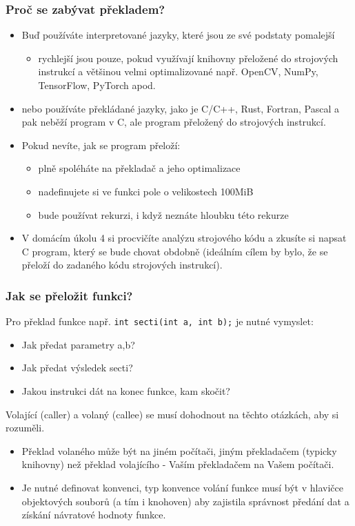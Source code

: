 \documentclass{beamer}
\begin{document}
\begin{frame}
\frametitle{Proč se zabývat překladem?}

\begin{itemize}
 \item Buď používáte interpretované jazyky, které jsou ze své podstaty pomalejší 
 \begin{itemize}
 \item rychlejší jsou pouze, pokud využívají knihovny přeložené do strojových instrukcí a většinou velmi optimalizované např. OpenCV, NumPy, TensorFlow,  PyTorch apod.
 \end{itemize}
 \item nebo používáte překládané jazyky, jako je C/C++, Rust, Fortran, Pascal a pak neběží program v C, ale program přeložený do strojových instrukcí. 
 \item Pokud nevíte, jak se program přeloží:
\begin{itemize}
 \item plně spoléháte na překladač a jeho optimalizace
 \item nadefinujete si ve funkci pole o velikostech 100MiB
 \item bude používat rekurzi, i když neznáte hloubku této rekurze
\end{itemize}
\item V domácím úkolu 4 si procvičíte analýzu strojového kódu a zkusíte si napsat C program, který se bude chovat obdobně (ideálním cílem by bylo, že se přeloží do zadaného kódu strojových instrukcí). 
\end{itemize}
\end{frame}


\begin{frame}
\frametitle{Jak se přeložit funkci?}

Pro překlad funkce např. \texttt{int secti(int a, int b);} je nutné vymyslet:
\begin{itemize}
 \item Jak předat parametry a,b?
 \item Jak předat výsledek secti?
 \item Jakou instrukci dát na konec funkce, kam skočit?
\end{itemize}

Volající (caller) a volaný (callee) se musí dohodnout na těchto otázkách, aby si rozuměli.
\begin{itemize}
 \item Překlad volaného může být na jiném počítači, jiným překladačem (typicky knihovny) než překlad volajícího - Vaším překladačem na Vašem počítači.
 \item Je nutné definovat konvenci, typ konvence volání funkce musí být v hlavičce objektových souborů (a tím i knohoven) aby zajistila správnost předání dat a získání návratové hodnoty funkce.
\end{itemize}
\end{frame}
\end{document}
